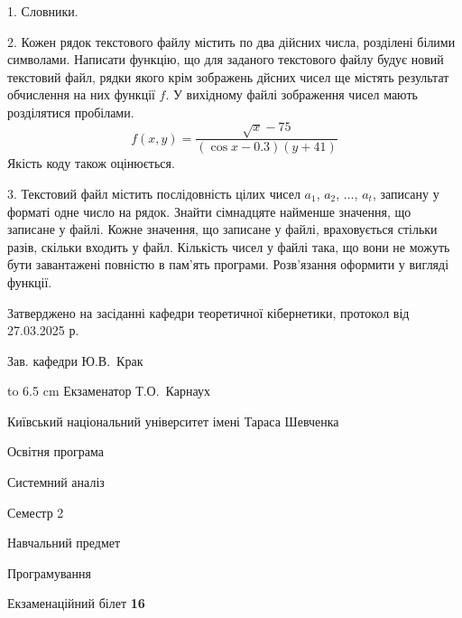 \documentclass[12pt, ukrainian]{article}
\begin{document}
{%
1. Словники.%
\par
\vspace{2mm}

2. Кожен рядок текстового файлу містить по два дійсних числа, розділені білими символами.
Написати функцію, що для заданого текстового файлу будує новий текстовий файл, рядки якого крім зображень дйсних чисел ще містять результат обчислення на них функції $f$. У вихідному файлі зображення чисел мають розділятися пробілами. 
$$f(x, y) =\frac{\sqrt x - 75}{(\cos x - 0.3) (y + 41)}$$ 
Якість коду також оцінюється.

\par
\vspace{2mm}

3. Текстовий файл містить послідовність цілих чисел $a_1$, $a_2$, $\ldots$, $a_t$, записану у форматі одне число на рядок. Знайти сімнадцяте найменше значення, що записане у файлі. Кожне значення, що записане у файлі, враховується стільки разів, скільки входить у файл. Кількість чисел у файлі така, що вони не можуть бути завантажені повністю в пам'ять програми. Розв'язання оформити у вигляді функції.

}
{\smallskip\smallskip \begin {scriptsize} Затверджено на засіданні кафедри теоретичної кібернетики, протокол   від   27.03.2025 р.\par\smallskip\smallskip\smallskip\smallskip
{\parbox {6.5 cm} {Зав. кафедри \dotfill Ю.В.~Крак}}\hspace {0.7cm} {\hbox to 6.5 cm { Екзаменатор \dotfill Т.О.~Карнаух}} \end{scriptsize}}
\vspace{2.9cm}
{{\begin {scriptsize}\par
{ \center  Київський національний університет імені Тараса Шевченка \par}
{\parbox {5 cm}{Освітня програма \hfill}{\parbox {7 cm}{Системний аналіз\hfill}}\parbox {6 cm}{\hfill Семестр 2}}\par
{\parbox {5 cm} {Навчальний предмет \hfill}\parbox {7 cm}{Програмування \hfill}\parbox {6cm}{\hfill}\par}\vspace{-15pt} \end{scriptsize}}{\center Екзаменаційний білет \No \textbf { 16 }\par}}
\end{document}
